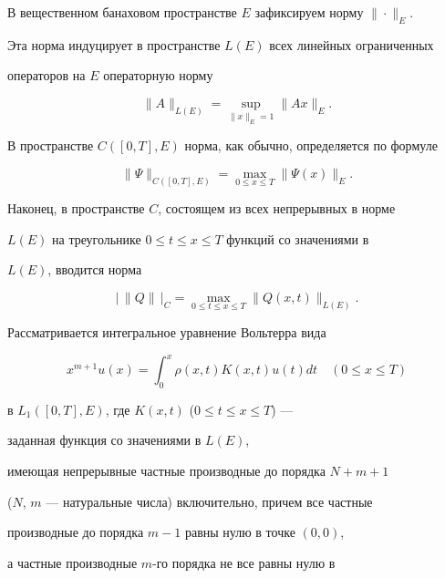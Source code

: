 \maketitle


\label{begin}








В вещественном банаховом пространстве $E$ зафиксируем норму $\|\cdot\|_E$. 


Эта норма индуцирует в пространстве $L(E)$ всех линейных ограниченных 


операторов на $E$ операторную норму


$$


\|A\|_{L(E)}=\sup_{\|x\|_E=1}\|Ax\|_E.


$$


В пространстве $C([0,T],E)$ норма, как обычно, определяется по формуле


$$


\|\Psi\|_{C([0,T],E)}=\max_{0\le x\le T}\|\Psi(x)\|_E.


$$


Наконец, в пространстве $C$, состоящем из всех непрерывных в норме 


$L(E)$ на треугольнике $0\le t\le x\le T$ функций со значениями в 


$L(E)$, вводится норма


$$


\big|\,\|Q\|\,\big|_C=\max_{0\le t\le x\le T}\|Q(x,t)\|_{L(E)}.


$$


Рассматривается интегральное уравнение Вольтерра вида 


\begin{equation}


x^{m+1}u(x)=\int^x_0\rho(x,t)K(x,t)u(t)dt\quad


(0\le x\le T)


\end{equation}


в $L_1([0,T],E)$, где $K(x,t)$ ($0\le t\le x\le T$) --- 


заданная функция со значениями в $L(E)$, 


имеющая непрерывные частные производные до порядка $N+m+1$ 


($N$, $m$ --- натуральные числа) включительно, причем все частные 


производные до порядка $m-1$ равны нулю в точке $(0,0)$,


а частные производные $m$-го порядка не все равны нулю в 



